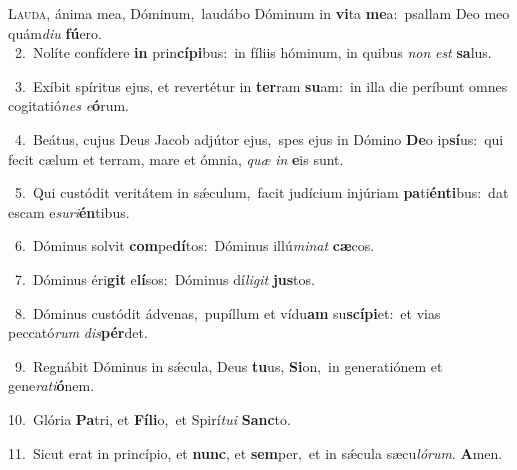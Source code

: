 \lettrine{\initial\textcolor{\initialcolor}{L}}{auda,} ánima mea, Dóminum,~\dagger laudábo Dóminum in \textbf{vi}\-ta \textbf{me}\-a:~\star psallam Deo meo quám\-\textit{di}\-\textit{u} \textbf{fú}\-ero.\\
{\numbfont\textcolor{\numbcolor}{~2.}}~Nolíte confídere \textbf{in} prin\-\textbf{cí}\-\textbf{pi}bus:~\star in fíliis hóminum, in quibus \textit{non} \textit{est} \textbf{sa}\-lus.\par
{\numbfont\textcolor{\numbcolor}{~3.}}~Exíbit spíritus ejus, et revertétur in \textbf{ter}\-ram \textbf{su}\-am:~\star in illa die períbunt omnes cogitatió\textit{nes} \textit{e}\-\textbf{ó}rum.\par
{\numbfont\textcolor{\numbcolor}{~4.}}~Beátus, cujus Deus Jacob adjútor ejus,~\dagger spes ejus in Dómino \textbf{De}\-o ip\-\textbf{sí}\-us:~\star qui fecit cælum et terram, mare et ómnia, \textit{quæ} \textit{in} \textbf{e}\-is sunt.\par
{\numbfont\textcolor{\numbcolor}{~5.}}~Qui custódit veritátem in sǽculum,~\dagger facit judícium injúriam \textbf{pa}\-ti\-\textbf{én}\-\textbf{ti}bus:~\star dat escam e\-\textit{su}\-\textit{ri}\textbf{én}tibus.\par
{\numbfont\textcolor{\numbcolor}{~6.}}~Dóminus solvit \textbf{com}\-pe\-\textbf{dí}\-tos:~\star Dóminus illú\-\textit{mi}\-\textit{nat} \textbf{cæ}\-cos.\par
{\numbfont\textcolor{\numbcolor}{~7.}}~Dóminus éri\textbf{git} e\-\textbf{lí}\-sos:~\star Dóminus dí\-\textit{li}\-\textit{git} \textbf{jus}\-tos.\par
{\numbfont\textcolor{\numbcolor}{~8.}}~Dóminus custódit ádvenas,~\dagger pupíllum et vídu\textbf{am} su\-\textbf{scí}\-\textbf{pi}et:~\star et vias peccató\textit{rum} \textit{dis}\-\textbf{pér}det.\par
{\numbfont\textcolor{\numbcolor}{~9.}}~Regnábit Dóminus in sǽcula, Deus \textbf{tu}\-us, \textbf{Si}\-on,~\star in generatiónem et gene\-\textit{ra}\-\textit{ti}\textbf{ó}nem.\par
{\numbfont\textcolor{\numbcolor}{10.}}~Glória \textbf{Pa}\-tri, et \textbf{Fí}\-\textbf{li}o,~\star et Spirí\-\textit{tu}\-\textit{i} \textbf{Sanc}\-to.\par
{\numbfont\textcolor{\numbcolor}{11.}}~Sicut erat in princípio, et \textbf{nunc}\-, et \textbf{sem}\-per,~\star et in sǽcula sæcu\-\textit{ló}\-\textit{rum}. \textbf{A}\-men.\par
